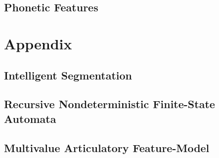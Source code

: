 \documentclass[10pt,letterpaper]{article}
\begin{document}
\subsection{Phonetic Features}\label{sec:features}

\section{Appendix}\label{sec:appendix}

\subsection{Intelligent Segmentation}\label{sec:segmentation}

\subsection{Recursive Nondeterministic Finite-State Automata}\label{sec:rndfa}

\subsection{Multivalue Articulatory Feature-Model}\label{sec:mafm}
\end{document}
